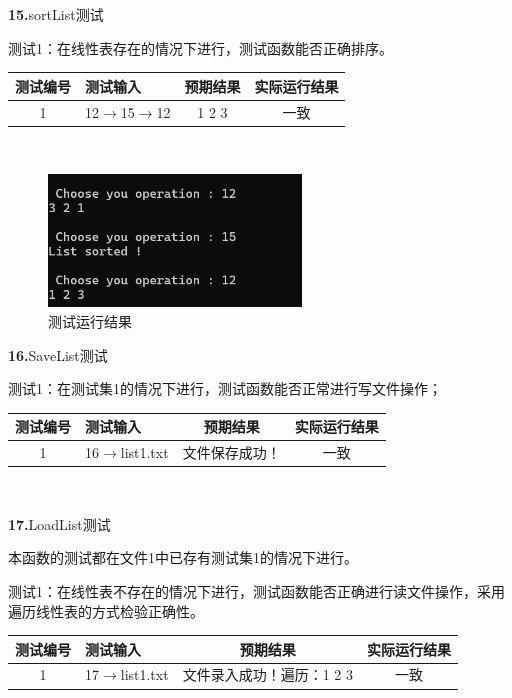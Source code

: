 \documentclass[supercite]{Experimental_Report}
\theoremstyle{definition}
\begin{document}
\noindent\textbf{15.}sortList测试

测试1：在线性表存在的情况下进行，测试函数能否正确排序。

\vspace{0.5em}

\begin{tabular}{|c|p{2.7cm}|c|c|}
	\hline
	测试编号 & 测试输入 & 预期结果 & 实际运行结果 \\
	\hline
	1 & 12$\rightarrow$15$\rightarrow$12 & 1 2 3 & 一致 \\
	\hline
\end{tabular}

~\

 \begin{figure}[H]
 	\centering
 	\includegraphics[width=0.6\textwidth]{images/线性表测试15.png}
 	\caption{测试运行结果}
 	\label{txlab}
 \end{figure}


\noindent\textbf{16.}SaveList测试
	
测试1：在测试集1的情况下进行，测试函数能否正常进行写文件操作；

\vspace{0.5em}

\begin{tabular}{|c|p{2.7cm}|c|c|}
	\hline
	测试编号 & 测试输入 & 预期结果 & 实际运行结果 \\
	\hline
	1 & 16$\rightarrow$list1.txt & 文件保存成功！ & 一致 \\
	\hline
\end{tabular}

~\

\noindent\textbf{17.}LoadList测试
	
本函数的测试都在文件1中已存有测试集1的情况下进行。

测试1：在线性表不存在的情况下进行，测试函数能否正确进行读文件操作，采用遍历线性表的方式检验正确性。

\vspace{0.5em}

\begin{tabular}{|c|p{2.7cm}|c|c|}
	\hline
	测试编号 & 测试输入 & 预期结果 & 实际运行结果 \\
	\hline
	1 & 17$\rightarrow$list1.txt & 文件录入成功！遍历：1 2 3 & 一致 \\
	\hline
\end{tabular}
\end{document}
